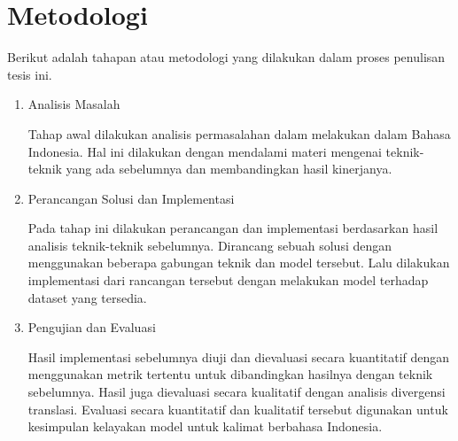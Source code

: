 \section{Metodologi}

Berikut adalah tahapan atau metodologi yang dilakukan dalam proses penulisan tesis ini.

\begin{enumerate}
  \item Analisis Masalah

  Tahap awal dilakukan analisis permasalahan dalam melakukan \amrparsing{} dalam Bahasa Indonesia.
  Hal ini dilakukan dengan mendalami materi mengenai teknik-teknik \amrparsing{} yang ada sebelumnya dan membandingkan hasil kinerjanya.

  \item Perancangan Solusi dan Implementasi

  Pada tahap ini dilakukan perancangan dan implementasi berdasarkan hasil analisis teknik-teknik \amrparsing{} sebelumnya.
  Dirancang sebuah solusi dengan menggunakan beberapa gabungan teknik dan model tersebut.
  Lalu dilakukan implementasi dari rancangan tersebut dengan melakukan  model terhadap dataset yang tersedia.

  \item Pengujian dan Evaluasi

  Hasil implementasi sebelumnya diuji dan dievaluasi secara kuantitatif dengan menggunakan metrik tertentu untuk dibandingkan hasilnya dengan teknik sebelumnya.
  Hasil \amrparsing{} juga dievaluasi secara kualitatif dengan analisis divergensi translasi.
  Evaluasi secara kuantitatif dan kualitatif tersebut digunakan untuk kesimpulan kelayakan model \amrparsing{} \crosslingual{} untuk kalimat berbahasa Indonesia.

\end{enumerate}
